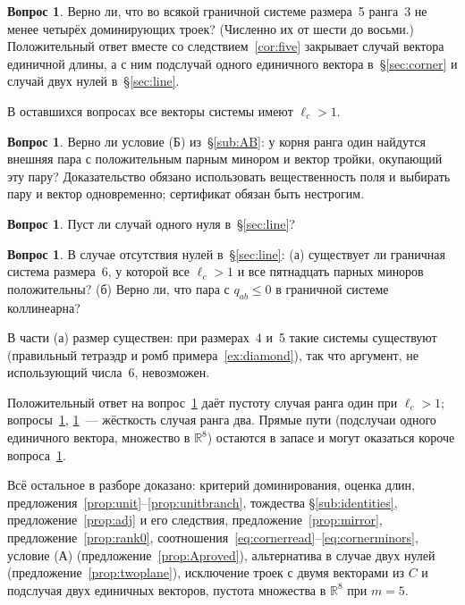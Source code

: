 \documentclass[11pt,a4paper]{article}
\theoremstyle{plain}
\theoremstyle{definition}
\newtheorem{question}[theorem]{Вопрос}
\theoremstyle{remark}
\newcommand{\RR}{\mathbb{R}}
\begin{document}
\begin{question}\label{q:five}
Верно ли, что во всякой граничной системе размера~5 ранга~3 не менее четырёх
доминирующих троек? (Численно их от шести до восьми.) Положительный ответ
вместе со следствием~\ref{cor:five} закрывает случай вектора единичной
длины, а с ним подслучай одного единичного вектора в~\S\ref{sec:corner} и
случай двух нулей в~\S\ref{sec:line}.
\end{question}

В оставшихся вопросах все векторы системы имеют $\ell_c>1$.

\begin{question}\label{q:B}
Верно ли условие (Б) из~\S\ref{sub:AB}: у корня ранга один найдутся внешняя
пара с положительным парным минором и вектор тройки, окупающий эту пару?
Доказательство обязано использовать вещественность поля и выбирать пару и
вектор одновременно; сертификат обязан быть нестрогим.
\end{question}

\begin{question}\label{q:k1}
Пуст ли случай одного нуля в~\S\ref{sec:line}?
\end{question}

\begin{question}\label{q:k0}
В случае отсутствия нулей в~\S\ref{sec:line}: (а) существует ли граничная
система размера~6, у которой все $\ell_c>1$ и все пятнадцать парных миноров
положительны? (б) Верно ли, что пара с $q_{ab}\le0$ в граничной системе
коллинеарна?
\end{question}

В части (а) размер существен: при размерах~4 и~5 такие системы существуют
(правильный тетраэдр и ромб примера~\ref{ex:diamond}), так что аргумент, не
использующий числа~6, невозможен.

Положительный ответ на вопрос~\ref{q:B} даёт пустоту случая ранга один при
$\ell_c>1$; вопросы~\ref{q:k1}, \ref{q:k0}~--- жёсткость случая ранга два.
Прямые пути (подслучаи одного единичного вектора, множество в $\RR^8$)
остаются в запасе и могут оказаться короче вопроса~\ref{q:five}.

Всё остальное в разборе доказано: критерий доминирования, оценка длин,
предложения~\ref{prop:unit}--\ref{prop:unitbranch}, тождества
\S\ref{sub:identities}, предложение~\ref{prop:adj} и его следствия,
предложение~\ref{prop:mirror}, предложение~\ref{prop:rank0},
соотношения~\eqref{eq:cornerread}--\eqref{eq:cornerminors}, условие (А)
(предложение~\ref{prop:Aproved}), альтернатива в случае двух нулей
(предложение~\ref{prop:twoplane}), исключение троек с двумя векторами из $C$
и подслучая двух единичных векторов, пустота множества в $\RR^8$ при $m=5$.
\end{document}
